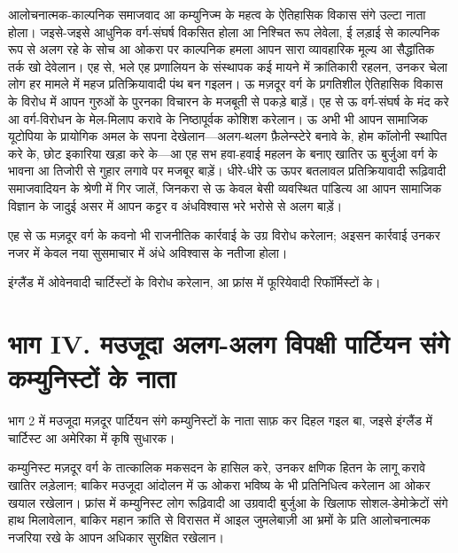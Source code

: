 \documentclass[12pt,a4paper,oneside]{book}
\begin{document}
आलोचनात्मक-काल्पनिक समाजवाद आ कम्युनिज्म के महत्व के ऐतिहासिक विकास संगे उल्टा नाता होला। जइसे-जइसे आधुनिक वर्ग-संघर्ष विकसित होला आ निश्चित रूप लेवेला, ई लड़ाई से काल्पनिक रूप से अलग रहे के सोच आ ओकरा पर काल्पनिक हमला आपन सारा व्यावहारिक मूल्य आ सैद्धांतिक तर्क खो देवेलान। एह से, भले एह प्रणालियन के संस्थापक कई मायने में क्रांतिकारी रहलन, उनकर चेला लोग हर मामले में महज प्रतिक्रियावादी पंथ बन गइलन। ऊ मज़दूर वर्ग के प्रगतिशील ऐतिहासिक विकास के विरोध में आपन गुरुओं के पुरनका विचारन के मजबूती से पकड़े बाड़ें। एह से ऊ वर्ग-संघर्ष के मंद करे आ वर्ग-विरोधन के मेल-मिलाप करावे के निष्ठापूर्वक कोशिश करेलान। ऊ अभी भी आपन सामाजिक यूटोपिया के प्रायोगिक अमल के सपना देखेलान—अलग-थलग फ़ैलेन्स्टेरे बनावे के, होम कॉलोनी स्थापित करे के, छोट इकारिया खड़ा करे के—आ एह सभ हवा-हवाई महलन के बनाए खातिर ऊ बुर्जुआ वर्ग के भावना आ तिजोरी से गुहार लगावे पर मजबूर बाड़ें। धीरे-धीरे ऊ ऊपर बतलावल प्रतिक्रियावादी रूढ़िवादी समाजवादियन के श्रेणी में गिर जालें, जिनकरा से ऊ केवल बेसी व्यवस्थित पांडित्य आ आपन सामाजिक विज्ञान के जादुई असर में आपन कट्टर व अंधविश्वास भरे भरोसे से अलग बाड़ें।

एह से ऊ मज़दूर वर्ग के कवनो भी राजनीतिक कार्रवाई के उग्र विरोध करेलान; अइसन कार्रवाई उनकर नजर में केवल नया सुसमाचार में अंधे अविश्वास के नतीजा होला।

इंग्लैंड में ओवेनवादी चार्टिस्टों के विरोध करेलान, आ फ्रांस में फूरियेवादी रिफॉर्मिस्टों के।

\cleardoublepage
\chapter*{भाग {\engfont IV}. मउजूदा अलग-अलग विपक्षी पार्टियन संगे कम्युनिस्टों के नाता}
भाग 2 में मउजूदा मज़दूर पार्टियन संगे कम्युनिस्टों के नाता साफ़ कर दिहल गइल बा, जइसे इंग्लैंड में चार्टिस्ट आ अमेरिका में कृषि सुधारक।

कम्युनिस्ट मज़दूर वर्ग के तात्कालिक मकसदन के हासिल करे, उनकर क्षणिक हितन के लागू करावे खातिर लड़ेलान; बाकिर मउजूदा आंदोलन में ऊ ओकरा भविष्य के भी प्रतिनिधित्व करेलान आ ओकर खयाल रखेलान। फ्रांस में कम्युनिस्ट लोग रूढ़िवादी आ उग्रवादी बुर्जुआ के खिलाफ सोशल-डेमोक्रेटों संगे हाथ मिलावेलान, बाकिर महान क्रांति से विरासत में आइल जुमलेबाज़ी आ भ्रमों के प्रति आलोचनात्मक नजरिया रखे के आपन अधिकार सुरक्षित रखेलान।
\end{document}
